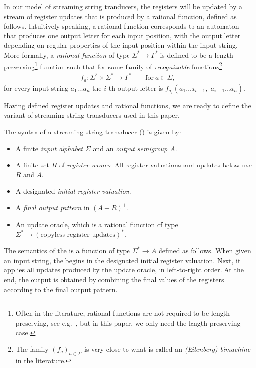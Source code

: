 In our model of streaming string tranducers, the registers will be updated by a
stream of register updates that is produced by a {rational function}, defined as
follows. Intuitively speaking, a rational function corresponds to an automaton
that produces one output letter for each input position, with the output letter
depending on regular properties of the input position within the input string.
More formally, a \emph{rational function} of type $\Sigma^* \to \Gamma^*$ is
defined to be a length-preserving\footnote{Often in the literature, rational
  functions are not required to be length-preserving, see
  e.g.~\cite[p.~525]{sakarovitch2009elements}, but in this paper, we only need
  the length-preserving case.} function such that for some family of
\emph{recognizable} functions\footnote{The family $(f_a)_{a\in\Sigma}$ is very
  close to what is called an \emph{(Eilenberg) bimachine} in the literature.}
\begin{align*}
 f_a \colon \Sigma^* \times \Sigma^* \to \Gamma^* \qquad\text{for}\ a \in \Sigma,
\end{align*}
for every input string $a_1 \dots a_n$ the $i$-th output letter is $f_{a_i}(a_1
\dots a_{i-1},\; a_{i+1} \dots a_n)$.

Having defined register updates and rational functions, we are ready to define the variant of streaming string transducers used in this paper.



\begin{definition}\label{def:usual-sst}
    The syntax of a streaming string transducer (\sst) is given by:
\begin{itemize}
    \item A finite \emph{input alphabet} $\Sigma$ and an \emph{output semigroup $A$}.
    \item A finite set $R$ of \emph{register names}. All register valuations and updates below use $R$ and $A$.
    \item A designated \emph{initial register valuation}.
    \item A \emph{final output pattern} in $(A+R)^+$.
    \item An update oracle, which is a rational function of type 
        $\Sigma^* \to (\text{copyless register updates})^*$.
\end{itemize}
\end{definition}
The semantics of the \sst{} is a function of type $\Sigma^* \to A$ defined as
follows. When given an input string, the \sst{} begins in the designated initial
register valuation. Next, it applies all updates produced by the update oracle,
in left-to-right order. At the end, the output is obtained by combining the
final values of the registers according to the final output pattern.

